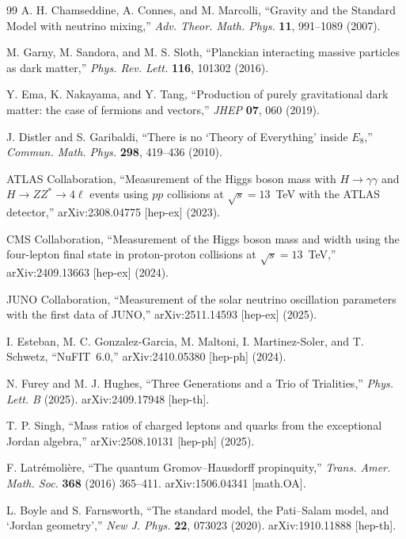 \documentclass[12pt,a4paper]{article}
\theoremstyle{definition}
\begin{document}
\begin{thebibliography}{99}
A. H. Chamseddine, A. Connes, and M. Marcolli, ``Gravity and the Standard Model with neutrino mixing,'' \textit{Adv. Theor. Math. Phys.} \textbf{11}, 991--1089 (2007).

M. Garny, M. Sandora, and M. S. Sloth, ``Planckian interacting massive particles as dark matter,'' \textit{Phys. Rev. Lett.} \textbf{116}, 101302 (2016).

Y. Ema, K. Nakayama, and Y. Tang, ``Production of purely gravitational dark matter: the case of fermions and vectors,'' \textit{JHEP} \textbf{07}, 060 (2019).

J. Distler and S. Garibaldi, ``There is no `Theory of Everything' inside $E_8$,'' \textit{Commun. Math. Phys.} \textbf{298}, 419--436 (2010).

ATLAS Collaboration, ``Measurement of the Higgs boson mass with $H \to \gamma\gamma$ and $H \to ZZ^* \to 4\ell$ events using $pp$ collisions at $\sqrt{s} = 13$~TeV with the ATLAS detector,'' arXiv:2308.04775 [hep-ex] (2023).

CMS Collaboration, ``Measurement of the Higgs boson mass and width using the four-lepton final state in proton-proton collisions at $\sqrt{s} = 13$~TeV,'' arXiv:2409.13663 [hep-ex] (2024).

JUNO Collaboration, ``Measurement of the solar neutrino oscillation parameters with the first data of JUNO,'' arXiv:2511.14593 [hep-ex] (2025).

I. Esteban, M. C. Gonzalez-Garcia, M. Maltoni, I. Martinez-Soler, and T. Schwetz, ``NuFIT~6.0,'' arXiv:2410.05380 [hep-ph] (2024).

N. Furey and M. J. Hughes, ``Three Generations and a Trio of Trialities,'' \textit{Phys. Lett. B} (2025). arXiv:2409.17948 [hep-th].

T. P. Singh, ``Mass ratios of charged leptons and quarks from the exceptional Jordan algebra,'' arXiv:2508.10131 [hep-ph] (2025).

F. Latr\'emoli\`ere, ``The quantum Gromov--Hausdorff propinquity,'' \textit{Trans. Amer. Math. Soc.} \textbf{368} (2016) 365--411. arXiv:1506.04341 [math.OA].

L. Boyle and S. Farnsworth, ``The standard model, the Pati--Salam model, and `Jordan geometry','' \textit{New J. Phys.} \textbf{22}, 073023 (2020). arXiv:1910.11888 [hep-th].


\end{thebibliography}
\end{document}
